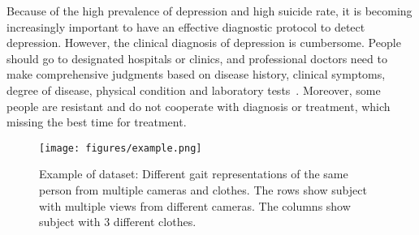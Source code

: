 \documentclass[10pt,twocolumn,letterpaper]{article}
\def\confName{CVPR}
\def\confYear{2023}
\begin{document}


Because of the high prevalence of depression and high suicide rate, it is becoming increasingly important to have an effective diagnostic protocol to detect depression. However, the clinical diagnosis of depression is cumbersome. People should go to designated hospitals or clinics, and professional doctors need to make comprehensive judgments based on disease history, clinical symptoms, degree of disease, physical condition and laboratory tests~\cite{faust1988expert}. Moreover, some people are resistant and do not cooperate with diagnosis or treatment, which missing the best time for treatment.



\begin{figure}[t]
  \centering
   \texttt{[image: figures/example.png]}

   \caption{Example of dataset: Different gait representations of the same person from multiple cameras and clothes. 
   The rows show subject with multiple views from different cameras. The columns show subject with 3 different clothes.
   }
   \label{Introduction}
\end{figure}

\end{document}
